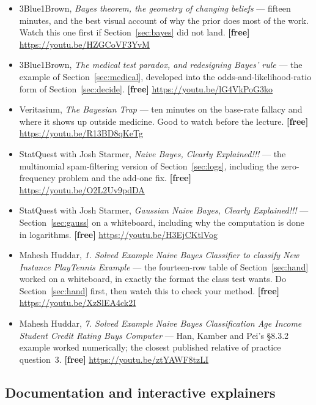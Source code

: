 \documentclass[11pt]{article}
\begin{document}
\begin{itemize}[leftmargin=*]
  \item 3Blue1Brown, \emph{Bayes theorem, the geometry of changing beliefs}
    --- fifteen minutes, and the best visual account of why the prior does
    most of the work. Watch this one first if Section~\ref{sec:bayes} did not
    land. \textbf{[free]} \url{https://youtu.be/HZGCoVF3YvM}
  \item 3Blue1Brown, \emph{The medical test paradox, and redesigning Bayes'
    rule} --- the example of Section~\ref{sec:medical}, developed into the
    odds-and-likelihood-ratio form of Section~\ref{sec:decide}.
    \textbf{[free]} \url{https://youtu.be/lG4VkPoG3ko}
  \item Veritasium, \emph{The Bayesian Trap} --- ten minutes on the base-rate
    fallacy and where it shows up outside medicine. Good to watch before the
    lecture. \textbf{[free]} \url{https://youtu.be/R13BD8qKeTg}
  \item StatQuest with Josh Starmer, \emph{Naive Bayes, Clearly Explained!!!}
    --- the multinomial spam-filtering version of Section~\ref{sec:logs},
    including the zero-frequency problem and the add-one fix.
    \textbf{[free]} \url{https://youtu.be/O2L2Uv9pdDA}
  \item StatQuest with Josh Starmer, \emph{Gaussian Naive Bayes, Clearly
    Explained!!!} --- Section~\ref{sec:gauss} on a whiteboard, including why
    the computation is done in logarithms. \textbf{[free]}
    \url{https://youtu.be/H3EjCKtlVog}
  \item Mahesh Huddar, \emph{1. Solved Example Naive Bayes Classifier to
    classify New Instance PlayTennis Example} --- the fourteen-row table of
    Section~\ref{sec:hand} worked on a whiteboard, in exactly the format the
    class test wants. Do Section~\ref{sec:hand} first, then watch this to
    check your method. \textbf{[free]} \url{https://youtu.be/XzSlEA4ck2I}
  \item Mahesh Huddar, \emph{7. Solved Example Naive Bayes Classification Age
    Income Student Credit Rating Buys Computer} --- Han, Kamber and Pei's
    \S8.3.2 example worked numerically; the closest published relative of
    practice question~3. \textbf{[free]} \url{https://youtu.be/ztYAWF8tzLI}
\end{itemize}

\subsection*{Documentation and interactive explainers}
\end{document}
